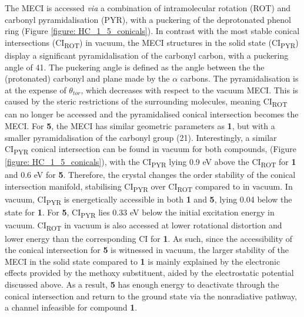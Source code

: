The \Kstar{} MECI is accessed \textit{via} a combination of intramolecular rotation (ROT) and carbonyl pyramidalisation (PYR), with a puckering of the deprotonated phenol ring (Figure \ref{figure: HC_1_5_conicals}). In contrast with the most stable conical intersections (CI\textsubscript{ROT}) in vacuum, the MECI structures in the solid state (CI\textsubscript{PYR}) display a significant pyramidalisation of the carbonyl carbon, with a puckering angle of 41\textdegree{}. The puckering angle is defined as the angle between the the (protonated) carbonyl and plane made by the $\alpha$ carbons. The pyramidalisation is at the expense of $\theta_{tor}$, which decreases with respect to the vacuum MECI.  This is caused by the steric restrictions of the surrounding molecules, meaning CI\textsubscript{ROT} can no longer be accessed and the pyramidalised conical intersection becomes the MECI. For \textbf{5}, the \Kstar{} MECI has similar geometric parameters as \textbf{1}, but with a smaller pyramidalisation of the carbonyl group (21\textdegree{}). Interestingly, a similar CI\textsubscript{PYR} conical intersection can be found in vacuum for both compounds, (Figure \ref{figure: HC_1_5_conicals}), with the CI\textsubscript{PYR} lying 0.9 eV above the CI\textsubscript{ROT} for \textbf{1} and 0.6 eV for \textbf{5}. Therefore, the crystal changes the order stability of the conical intersection manifold, stabilising CI\textsubscript{PYR} over CI\textsubscript{ROT} compared to in vacuum. In vacuum, CI\textsubscript{PYR} is energetically accessible in both \textbf{1} and \textbf{5}, lying 0.04 below the \sone{} state for \textbf{1}. For \textbf{5}, CI\textsubscript{PYR} lies 0.33 eV below the initial excitation energy in vacuum. CI\textsubscript{ROT} in vacuum is also accessed at lower rotational distortion and lower energy than the corresponding CI for \textbf{1}. As such, since the accessibility of the conical intersection for \textbf{5} is witnessed in vacuum, the larger stability of the MECI in the solid state compared to \textbf{1} is mainly explained by the electronic effects provided by the methoxy substituent, aided by the electrostatic potential discussed above. As a result, \textbf{5} has enough energy to deactivate through the conical intersection and return to the ground state via the nonradiative pathway, a channel infeasible for compound \textbf{1}. 

